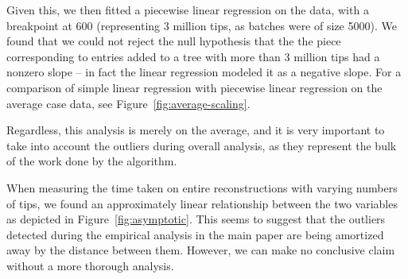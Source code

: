 Given this, we then fitted a piecewise linear regression on the data, with a breakpoint at 600 (representing 3 million tips, as batches were of size 5000).
We found that we could not reject the null hypothesis that the the piece corresponding to entries added to a tree with more than 3 million tips had a nonzero slope -- in fact the linear regression modeled it as a negative slope.
For a comparison of simple linear regression with piecewise linear regression on the average case data, see Figure~\ref{fig:average-scaling}.

Regardless, this analysis is merely on the average, and it is very important to take into account the outliers during overall analysis, as they represent the bulk of the work done by the algorithm.



When measuring the time taken on entire reconstructions with varying numbers of tips, we found an approximately linear relationship between the two variables as depicted in Figure~\ref{fig:asymptotic}. 
This seems to suggest that the outliers detected during the empirical analysis in the main paper are being amortized away by the distance between them. 
However, we can make no conclusive claim without a more thorough analysis.



